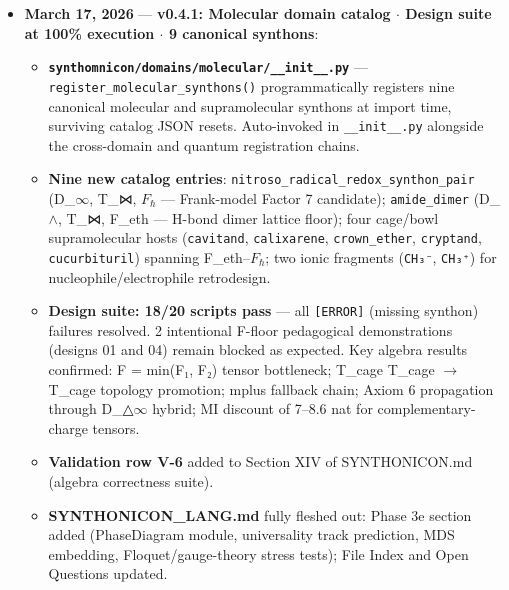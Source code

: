 \documentclass[12pt,a4paper]{article}
\begin{document}
\begin{itemize}
\begin{itemize}
    \item \textbf{\texttt{SYNTHONICON.md §X}} expanded from 11 to \textasciitilde{}100 lines: X.1 Path algebra theorem, X.2 Eleven encodings table, X.3 F--K programmability quadrant, X.4 $\Phi$\_c as global programmability, X.5 programmability lattice (floor = $\Phi$\_c theorem), X.6 cross-domain analogies (condensate $\approx$ allosteric d=2.50, colloidal $\approx$ TI d=2.80).
\end{itemize}

    \item 
    \textbf{March 17, 2026} --- \textbf{v0.4.1: Molecular domain catalog $\cdot$ Design suite at 100\% execution $\cdot$ 9 canonical synthons}:

    \begin{itemize}
    \item \textbf{\texttt{synthomnicon/domains/molecular/\_\_init\_\_.py}} --- \texttt{register\_molecular\_synthons()} programmatically registers nine canonical molecular and supramolecular synthons at import time, surviving catalog JSON resets. Auto-invoked in \texttt{\_\_init\_\_.py} alongside the cross-domain and quantum registration chains.
    \item \textbf{Nine new catalog entries}: \texttt{nitroso\_radical\_redox\_synthon\_pair} (D\_$\infty$, T\_⋈, $F_{\hbar}$ --- Frank-model Factor 7 candidate); \texttt{amide\_dimer} (D\_$\land$, T\_⋈, F\_eth --- H-bond dimer lattice floor); four cage/bowl supramolecular hosts (\texttt{cavitand}, \texttt{calixarene}, \texttt{crown\_ether}, \texttt{cryptand}, \texttt{cucurbituril}) spanning F\_eth--$F_{\hbar}$; two ionic fragments (\texttt{CH₃⁻}, \texttt{CH₃⁺}) for nucleophile/electrophile retrodesign.
    \item \textbf{Design suite: 18/20 scripts pass} --- all \texttt{{[}ERROR{]}} (missing synthon) failures resolved. 2 intentional F-floor pedagogical demonstrations (designs 01 and 04) remain blocked as expected. Key algebra results confirmed: F = min(F₁, F₂) tensor bottleneck; T\_cage \otimes T\_cage $\rightarrow$ T\_cage topology promotion; mplus fallback chain; Axiom 6 propagation through D\_△$\infty$ hybrid; MI discount of 7--8.6 nat for complementary-charge tensors.
    \item \textbf{Validation row V-6} added to Section XIV of SYNTHONICON.md (algebra correctness suite).
    \item \textbf{SYNTHONICON\_LANG.md} fully fleshed out: Phase 3e section added (PhaseDiagram module, universality track prediction, MDS embedding, Floquet/gauge-theory stress tests); File Index and Open Questions updated.
\end{itemize}


\end{itemize}
\end{document}
